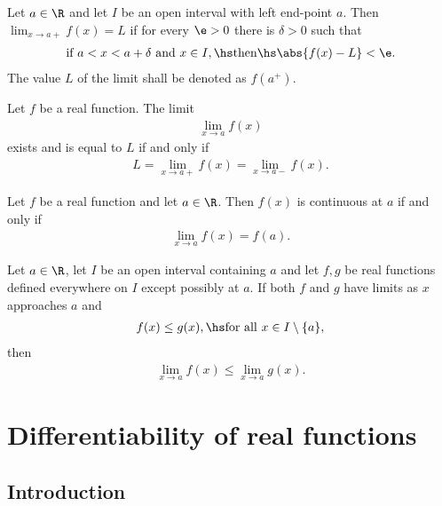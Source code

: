 \documentclass{article}
\begin{document}
\begin{theorem}
    Let $a\in\R$ and let $I$ be an open interval with left end-point
    $a$. Then $\lim_{x\to a+} f(x)=L$ if for every $\e>0$ there is
    $\delta>0$ such that
    \begin{align*}
        \text{if } a<x<a+\delta \text{ and }x\in I,\hs
        \text{then}\hs \abs{f(x)-L}<\e.
    \end{align*}
    The value $L$ of the limit shall be denoted as $f(a^+)$.
\end{theorem}

\begin{theorem}
    Let $f$ be a real function. The limit
    \begin{align*}
        \lim_{x\to a}f(x)
    \end{align*}
    exists and is equal to $L$ if and only if
    \begin{align*}
        L=\lim_{x\to a+}f(x)=\lim_{x\to a-}f(x).
    \end{align*}
\end{theorem}

\begin{proposition}
    Let $f$ be a real function and let $a\in\R$. Then
    $f(x)$ is continuous at $a$ if and only if
    \begin{align*}
        \lim_{x\to a}f(x)=f(a).
    \end{align*}
\end{proposition}

\setcounter{theorem}{9}
\begin{theorem}
    Let $a\in\R$, let $I$ be an open interval containing
    $a$ and let $f,g$ be real functions defined everywhere
    on $I$ except possibly at $a$. If both $f$ and $g$ have
    limits as $x$ approaches $a$ and
    \begin{align*}
        f(x)\leq g(x),\hs\text{for all }x\in I\setminus\{a\},
    \end{align*}
    then
    \begin{align*}
        \lim_{x\to a}f(x)\leq\lim_{x\to a} g(x).
    \end{align*}
\end{theorem}


\section{Differentiability of real functions}


\subsection{Introduction}
\end{document}
